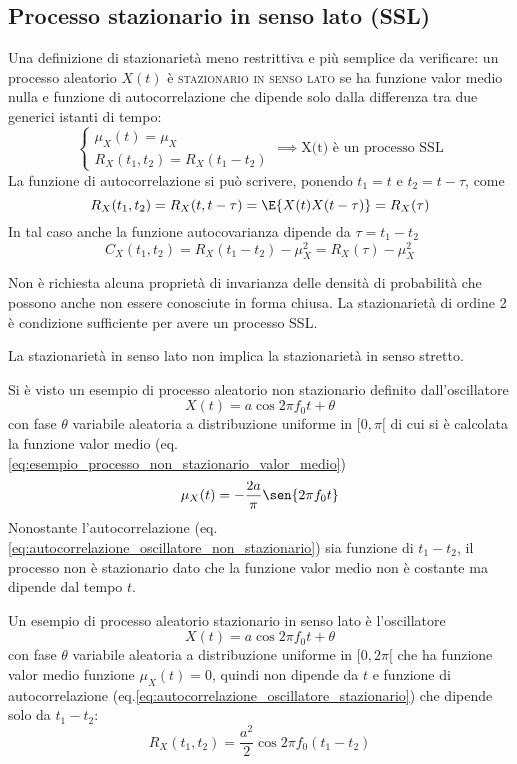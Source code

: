 \subsection{Processo stazionario in senso lato (SSL)}
Una definizione di stazionarietà meno restrittiva e più semplice da verificare: un processo aleatorio $X(t)$ è \textsc{stazionario in senso lato} se ha funzione valor medio nulla e funzione di autocorrelazione che dipende solo dalla differenza tra due generici istanti di tempo:
\begin{equation}
\label{eq:processo_stazionario_senso_lato}
	\begin{cases}
		\mu_X(t)=\mu_X\\
		R_X(t_1,t_2)=R_X(t_1-t_2)
	\end{cases}\implies \text{X(t) è un processo SSL}
\end{equation}
La funzione di autocorrelazione si può scrivere, ponendo $t_1=t$ e $t_2=t-\tau$, come
\begin{equation}
	R_X(t_1,t_2)=R_X(t,t-\tau)=\E{X(t)X(t-\tau)}=R_X(\tau)
\end{equation}
In tal caso anche la funzione autocovarianza dipende da $\tau=t_1-t_2$
\begin{equation}
	C_X(t_1,t_2)=R_X(t_1-t_2)-\mu^2_X=R_X(\tau)-\mu^2_X
\end{equation}

Non è richiesta alcuna proprietà di invarianza delle densità di probabilità che possono anche non essere conosciute in forma chiusa.
La stazionarietà di ordine 2 è condizione sufficiente per avere un processo SSL.
\begin{nota}
	La stazionarietà in senso lato non implica la stazionarietà in senso stretto.
\end{nota}
\begin{esempio}
Si è visto un esempio di processo aleatorio non stazionario definito dall'oscillatore
\[
	X(t)=a\cos{2\pi f_0 t+\theta}
\]
con fase $\theta$ variabile aleatoria a distribuzione uniforme in $[0,\pi[$
di cui si è calcolata la funzione valor medio (eq. \ref{eq:esempio_processo_non_stazionario_valor_medio})
\[
	\mu_X(t)=-\frac{2a}{\pi}\sen{2\pi f_0 t}
\]
Nonostante l'autocorrelazione (eq.\ref{eq:autocorrelazione_oscillatore_non_stazionario}) sia funzione di $t_1-t_2$, il processo non è stazionario dato che la funzione valor medio non è costante ma dipende dal tempo $t$.
\end{esempio}

\begin{esempio}
\label{es:oscillatore_stazionario_senso_lato}
Un esempio di processo aleatorio stazionario in senso lato è l'oscillatore
\[
	X(t)=a\cos{2\pi f_0 t+\theta}
\]
con fase $\theta$ variabile aleatoria a distribuzione uniforme in $[0,2\pi[$
che ha funzione valor medio funzione $\mu_X(t)=0$, quindi non dipende da $t$ e funzione di autocorrelazione (eq.\ref{eq:autocorrelazione_oscillatore_stazionario}) che dipende solo da $t_1-t_2$:
\[
	R_X(t_1,t_2)=\frac{a^2}{2}\cos{2\pi f_0(t_1-t_2)}
\]
\end{esempio}

